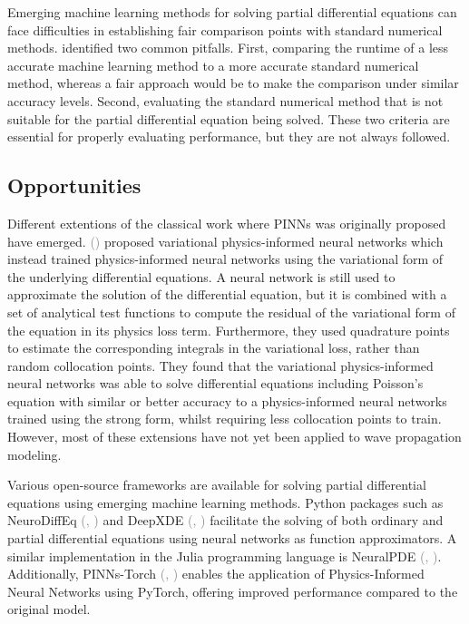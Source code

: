 \documentclass[11pt,twoside]{article}
\renewcommand{\citep}[2][]{\textcolor{gray}{(\citeauthor{#2}, \citeyear[#1]{#2})}}
\renewcommand{\citeauthoryear}[2][]{\textcolor{gray}{\citeauthor{#2} (\textcolor{gray}{\citeyear[#1]{#2}})}}
\begin{document}
Emerging machine learning methods for solving partial differential equations can face difficulties in establishing fair comparison points with standard numerical methods. \citeauthor{mcgreivy_weak_2024} identified two common pitfalls. First, comparing the runtime of a less accurate machine learning method to a more accurate standard numerical method, whereas a fair approach would be to make the comparison under similar accuracy levels. Second, evaluating the standard numerical method that is not suitable for the partial differential equation being solved. These two criteria are essential for properly evaluating performance, but they are not always followed. 

\subsection{Opportunities}

Different extentions of the classical work where PINNs was originally proposed have emerged. \citeauthoryear{kharazmi_variational_2019} proposed variational physics-informed neural networks which instead trained physics-informed neural networks using the variational form of the underlying differential equations. A neural network is still used to approximate the solution of the differential equation, but it is combined with a set of analytical test functions to compute the residual of the variational form of the equation in its physics loss term. Furthermore, they used quadrature points to estimate the corresponding integrals in the variational loss, rather than random collocation points. They found that the variational physics-informed neural networks was able to solve differential equations including Poisson’s equation with similar or better accuracy to a physics-informed neural networks trained using the strong form, whilst requiring less collocation points to train. However, most of these extensions have not yet been applied to wave propagation modeling.

Various open-source frameworks are available for solving partial differential equations using emerging machine learning methods. Python packages such as NeuroDiffEq \citep{chen2020neurodiffeq} and DeepXDE \citep{lu2021deepxde} facilitate the solving of both ordinary and partial differential equations using neural networks as function approximators. A similar implementation in the Julia programming language is NeuralPDE \citep{https://doi.org/10.48550/arxiv.2107.09443}. Additionally, PINNs-Torch \citep{bafghi_pinns-torch_2023} enables the application of Physics-Informed Neural Networks using PyTorch, offering improved performance compared to the original model.
\end{document}
